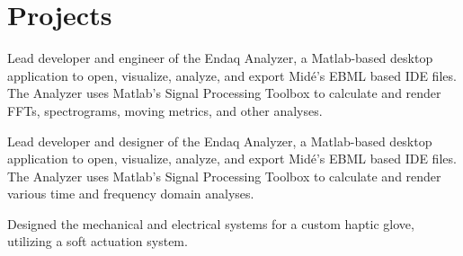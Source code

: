 \documentclass[letterpaper]{deedy-resume} %
\begin{document}
\sectionspace %


\section{Projects}



\sectionspace %



Lead developer and engineer of the Endaq Analyzer, a Matlab-based desktop application to open, visualize, analyze, and export Midé's EBML based IDE files.  The Analyzer uses Matlab's Signal Processing Toolbox to calculate and render FFTs, spectrograms, moving metrics, and other analyses.  

\sectionspace %



Lead developer and designer of the Endaq Analyzer, a Matlab-based desktop application to open, visualize, analyze, and export Midé's EBML based IDE files.  The Analyzer uses Matlab's Signal Processing Toolbox to calculate and render various time and frequency domain analyses.  

\sectionspace %



Designed the mechanical and electrical systems for a custom haptic glove, utilizing a soft actuation system.  
\end{document}

